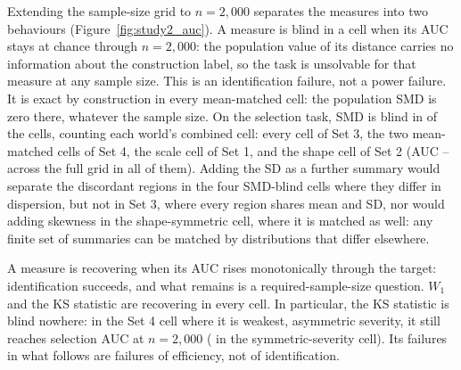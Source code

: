 \documentclass[AMA,Times1COL]{WileyNJDv5}
\begin{document}
Extending the sample-size grid to $n = 2{,}000$ separates the measures into two behaviours (Figure~\ref{fig:study2_auc}). A measure is blind in a cell when its AUC stays at chance through $n = 2{,}000$: the population value of its distance carries no information about the construction label, so the task is unsolvable for that measure at any sample size. This is an identification failure, not a power failure. It is exact by construction in every mean-matched cell: the population SMD is zero there, whatever the sample size. On the selection task, SMD is blind in  of the  cells, counting each world's combined cell: every cell of Set 3, the two mean-matched cells of Set 4, the scale cell of Set 1, and the shape cell of Set 2 (AUC -- across the full grid in all of them). Adding the SD as a further summary would separate the discordant regions in the four SMD-blind cells where they differ in dispersion, but not in Set 3, where every region shares mean and SD, nor would adding skewness in the shape-symmetric cell, where it is matched as well: any finite set of summaries can be matched by distributions that differ elsewhere.

A measure is recovering when its AUC rises monotonically through the target: identification succeeds, and what remains is a required-sample-size question. $W_1$ and the KS statistic are recovering in every cell. In particular, the KS statistic is blind nowhere: in the Set 4 cell where it is weakest, asymmetric severity, it still reaches selection AUC  at $n = 2{,}000$ ( in the symmetric-severity cell). Its failures in what follows are failures of efficiency, not of identification.
\end{document}
